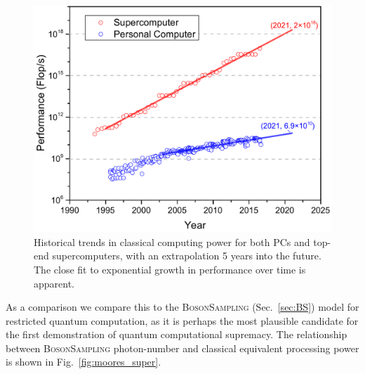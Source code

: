 \documentclass[aps,rmp,twocolumn,amsmath,amssymb,nofootinbib,superscriptaddress,longbibliography,floatfix,table-of-contents,eqsecnum]{revtex4-1}
\begin{document}
\begin{figure}[!htb]
\includegraphics[width=\columnwidth]{moores_law}
\caption{Historical trends in classical computing power for both PCs and top-end supercomputers, with an extrapolation 5 years into the future. The close fit to exponential growth in performance over time is apparent.} \label{fig:moores_law}
\end{figure}

As a comparison we compare this to the \textsc{BosonSampling} (Sec.~\ref{sec:BS}) model for restricted quantum computation, as it is perhaps the most plausible candidate for the first demonstration of quantum computational supremacy. The relationship between \textsc{BosonSampling} photon-number and classical equivalent processing power is shown in Fig.~\ref{fig:moores_super}.
\end{document}
